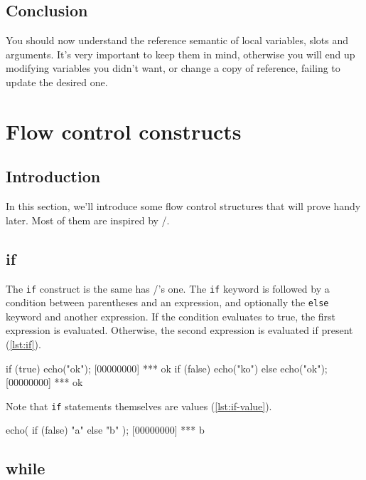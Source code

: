 \documentclass[openright,twoside,12pt]{report}
\begin{document}
\section{Conclusion}

You should now understand the reference semantic of local variables,
slots and arguments. It's very important to keep them in mind,
otherwise you will end up modifying variables you didn't want, or
change a copy of reference, failing to update the desired one.

\chapter{Flow control constructs}

\section{Introduction}

In this section, we'll introduce some flow control structures that
will prove handy later. Most of them are inspired by \C/\Cxx.

\section{if}

The \texttt{if} construct is the same has \C/\Cxx's one. The
\texttt{if} keyword is followed by a condition between parentheses and
an expression, and optionally the \texttt{else} keyword and another
expression. If the condition evaluates to true, the first expression
is evaluated. Otherwise, the second expression is evaluated if
present (\autoref{lst:if}).

\begin{urbiscript}[caption=The \texttt{if} construct, label=lst:if]
if (true)
  echo("ok");
[00000000] *** ok
if (false)
  echo("ko")
else
  echo("ok");
[00000000] *** ok
\end{urbiscript}

Note that \lstinline|if| statements themselves are values
(\autoref{lst:if-value}).

\begin{urbiscript}[caption=\texttt{if} are values, label=lst:if-value]
echo({ if (false) "a" else "b" });
[00000000] *** b
\end{urbiscript}

\section{while}
\end{document}
